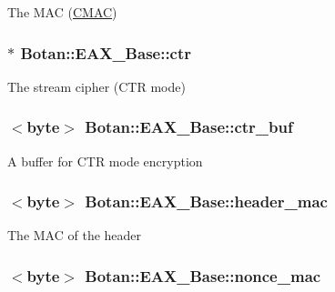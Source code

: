 The M\-A\-C (\hyperlink{classBotan_1_1CMAC}{C\-M\-A\-C}) \hypertarget{classBotan_1_1EAX__Base_ad8830a9fd4b01dc4599b4f690ebea28b}{
\subsubsection[{ctr}]{$\ast$ Botan\-::\-E\-A\-X\-\_\-\-Base\-::ctr\hspace{0.3cm}{\ttfamily [protected]}}}\label{classBotan_1_1EAX__Base_ad8830a9fd4b01dc4599b4f690ebea28b}
The stream cipher (C\-T\-R mode) \hypertarget{classBotan_1_1EAX__Base_a0fd5a38b386d0ce1fc2cdcfede7171f2}{
\subsubsection[{ctr\-\_\-buf}]{$<${\bf byte}$>$ Botan\-::\-E\-A\-X\-\_\-\-Base\-::ctr\-\_\-buf\hspace{0.3cm}{\ttfamily [protected]}}}\label{classBotan_1_1EAX__Base_a0fd5a38b386d0ce1fc2cdcfede7171f2}
A buffer for C\-T\-R mode encryption \hypertarget{classBotan_1_1EAX__Base_a78d02509f0aa211c3f3ef6a708470bbe}{
\subsubsection[{header\-\_\-mac}]{$<${\bf byte}$>$ Botan\-::\-E\-A\-X\-\_\-\-Base\-::header\-\_\-mac\hspace{0.3cm}{\ttfamily [protected]}}}\label{classBotan_1_1EAX__Base_a78d02509f0aa211c3f3ef6a708470bbe}
The M\-A\-C of the header \hypertarget{classBotan_1_1EAX__Base_a9c45bb808c6642a083619654e6809f86}{
\subsubsection[{nonce\-\_\-mac}]{$<${\bf byte}$>$ Botan\-::\-E\-A\-X\-\_\-\-Base\-::nonce\-\_\-mac\hspace{0.3cm}{\ttfamily [protected]}}}\label{classBotan_1_1EAX__Base_a9c45bb808c6642a083619654e6809f86}
